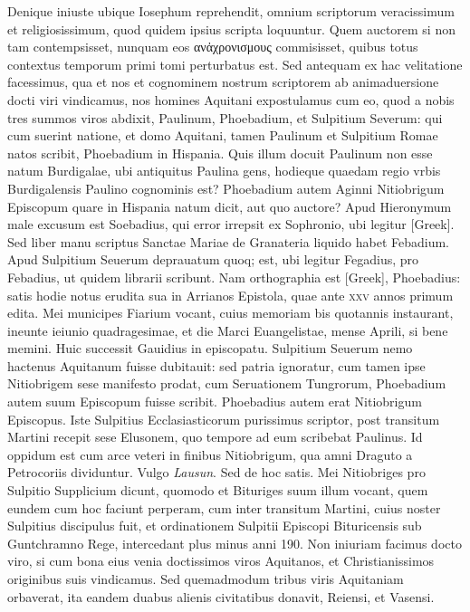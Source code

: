 Denique iniuste
ubique Iosephum reprehendit, omnium scriptorum veracissimum
et religiosissimum, quod quidem ipsius scripta loquuntur.
Quem
auctorem si non tam contempsisset, nunquam eos
 \textgreek{ανἀχρονισμους}
 commisisset,
quibus totus contextus temporum primi tomi perturbatus
est.
Sed antequam ex hac velitatione facessimus, qua et nos et cognominem
nostrum scriptorem ab animaduersione docti viri vindicamus,
nos homines Aquitani expostulamus cum eo, quod a nobis
tres summos viros abdixit, Paulinum, Phoebadium, et Sulpitium
Severum:
qui cum suerint natione, et domo Aquitani, tamen
Paulinum et Sulpitium Romae natos scribit, Phoebadium in Hispania.
Quis illum docuit Paulinum non esse natum Burdigalae, ubi
antiquitus Paulina gens, hodieque quaedam regio vrbis Burdigalensis
Paulino cognominis est?
Phoebadium autem Aginni Nitiobrigum
Episcopum quare in Hispania natum dicit, aut quo auctore?
Apud Hieronymum male excusum est Soebadius, qui error irrepsit
ex Sophronio, ubi legitur \textgreek{[Greek]}.
Sed liber manu scriptus
Sanctae Mariae de Granateria liquido habet Febadium.
Apud Sulpitium
Seuerum deprauatum quoq; est, ubi legitur Fegadius, pro
Febadius, ut quidem librarii scribunt.
Nam orthographia est \textgreek{[Greek]},
Phoebadius: satis hodie notus erudita sua in Arrianos Epistola,
quae ante \textsc{xxv} annos primum edita.
Mei municipes Fiarium vocant,
cuius memoriam bis quotannis instaurant, ineunte ieiunio
quadragesimae, et die Marci Euangelistae, mense Aprili, si bene
memini.
Huic successit Gauidius in episcopatu.
Sulpitium Seuerum
nemo hactenus Aquitanum fuisse dubitauit: sed patria ignoratur,
cum tamen ipse Nitiobrigem sese manifesto prodat, cum Seruationem
Tungrorum, Phoebadium autem suum Episcopum fuisse scribit.
Phoebadius autem erat Nitiobrigum Episcopus.
Iste Sulpitius
Ecclasiasticorum purissimus scriptor, post transitum Martini recepit
sese Elusonem, quo tempore ad eum scribebat Paulinus.
Id oppidum est cum arce veteri in finibus Nitiobrigum, qua amni Draguto
a Petrocoriis dividuntur.
Vulgo \textit{Lausun}.
Sed de hoc satis.
Mei
Nitiobriges pro Sulpitio Supplicium dicunt, quomodo et Bituriges
suum illum vocant, quem eundem cum hoc faciunt perperam,
cum inter transitum Martini, cuius noster Sulpitius discipulus fuit,
et ordinationem Sulpitii Episcopi Bituricensis sub Guntchramno
Rege, intercedant plus minus anni 190.
Non iniuriam facimus
docto viro, si cum bona eius venia doctissimos viros Aquitanos,
et Christianissimos originibus suis vindicamus.
{}
Sed quemadmodum tribus viris Aquitaniam orbaverat, ita eandem duabus
alienis civitatibus donavit, Reiensi, et Vasensi.

